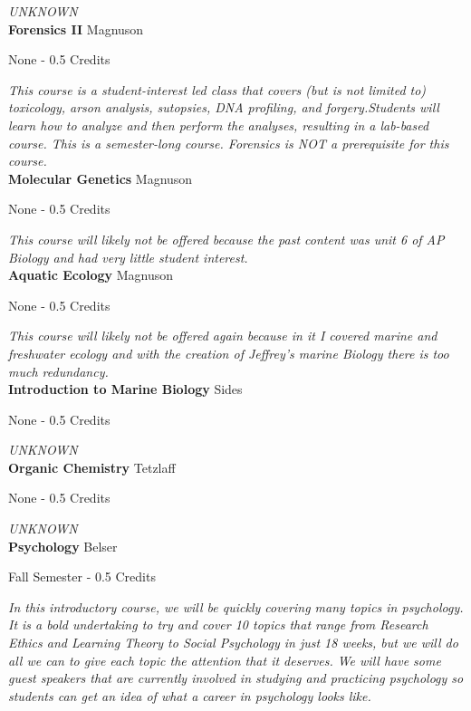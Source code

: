 \vspace{1mm}\emph{UNKNOWN}\\


\noindent\textbf{Forensics II} \hfill Magnuson

\noindent None - 0.5 Credits

\vspace{1mm}\emph{This course is a student-interest led class that covers (but is not limited to) toxicology, arson analysis, sutopsies, DNA profiling, and forgery.Students will learn how to analyze and then perform the analyses, resulting in a lab-based course. This is a semester-long course. Forensics is NOT a prerequisite for this course. }\\


\noindent\textbf{Molecular Genetics} \hfill Magnuson

\noindent None - 0.5 Credits

\vspace{1mm}\emph{This course will likely not be offered because the past content was unit 6 of AP Biology and had very little student interest.}\\


\noindent\textbf{Aquatic Ecology} \hfill Magnuson

\noindent None - 0.5 Credits

\vspace{1mm}\emph{This course will likely not be offered again because in it I covered marine and freshwater ecology and with the creation of Jeffrey's marine Biology there is too much redundancy.}\\


\noindent\textbf{Introduction to Marine Biology} \hfill Sides

\noindent None - 0.5 Credits

\vspace{1mm}\emph{UNKNOWN}\\


\noindent\textbf{Organic Chemistry} \hfill Tetzlaff

\noindent None - 0.5 Credits

\vspace{1mm}\emph{UNKNOWN}\\


\noindent\textbf{Psychology} \hfill Belser

\noindent Fall Semester - 0.5 Credits

\vspace{1mm}\emph{In this introductory course, we will be quickly covering many topics in psychology. It is a bold undertaking to try and cover 10 topics that range from Research Ethics and Learning Theory to Social Psychology in just 18 weeks, but we will do all we can to give each topic the attention that it deserves. We will have some guest speakers that are currently involved in studying and practicing psychology so students can get an idea of what a career in psychology looks like.}\\


